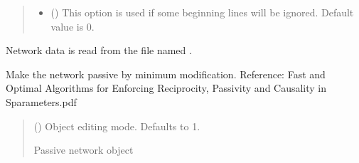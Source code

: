 \documentclass[letterpaper,10pt,english]{sphinxmanual}
\begin{document}
\begin{fulllineitems}
\begin{fulllineitems}
\begin{quote}
\begin{description}
\begin{itemize}
\item {} 
\sphinxAtStartPar
{} (\sphinxstyleliteralemphasis{\sphinxupquote{, }}) \textendash{} This option is used if some beginning lines will be ignored. Default value is 0.

\end{itemize}

\end{description}\end{quote}

\end{fulllineitems}


\begin{fulllineitems}
\label{\detokenize{touchstone:touchstone.spfile.read_file_again}}
\pysigstartsignatures
{}
\pysigstopsignatures
\sphinxAtStartPar
Network data is read from the file named .

\end{fulllineitems}


\begin{fulllineitems}
\label{\detokenize{touchstone:touchstone.spfile.restore_passivity}}
\pysigstartsignatures
{}
\pysigstopsignatures
\sphinxAtStartPar
Make the network passive by minimum modification.
Reference: Fast and Optimal Algorithms for Enforcing Reciprocity, Passivity and Causality in S\sphinxhyphen{}parameters.pdf
\begin{quote}\begin{description}
\sphinxAtStartPar
{} (\sphinxstyleliteralemphasis{\sphinxupquote{, }}) \textendash{} Object editing mode. Defaults to \sphinxhyphen{}1.

\sphinxAtStartPar
Passive network object


\end{description}
\end{quote}
\end{fulllineitems}
\end{fulllineitems}
\end{document}
